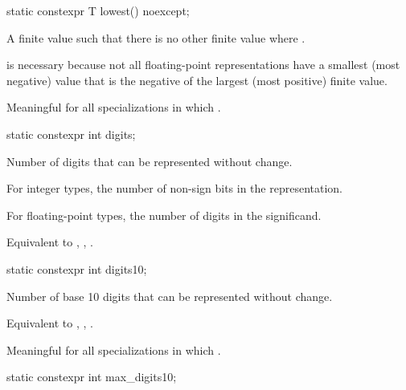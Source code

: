 %
\begin{itemdecl}
static constexpr T lowest() noexcept;
\end{itemdecl}

\begin{itemdescr}
\pnum
A finite value  such that there is no other finite
value  where .
\begin{footnote}
 is necessary because not all
floating-point representations have a smallest (most negative) value that is
the negative of the largest (most positive) finite value.
\end{footnote}

\pnum
Meaningful for all specializations in which .
\end{itemdescr}

%
\begin{itemdecl}
static constexpr int digits;
\end{itemdecl}

\begin{itemdescr}
\pnum
Number of
digits that can be represented without change.

\pnum
For integer types, the number of non-sign bits in the representation.

\pnum
For floating-point types, the number of  digits in the
significand.
\begin{footnote}
Equivalent to , ,
.
\end{footnote}
\end{itemdescr}

%
\begin{itemdecl}
static constexpr int digits10;
\end{itemdecl}

\begin{itemdescr}
\pnum
Number of base 10 digits that can be represented without
change.
\begin{footnote}
Equivalent to , ,
.
\end{footnote}

\pnum
Meaningful for all specializations in which
.
\end{itemdescr}

%
\begin{itemdecl}
static constexpr int max_digits10;
\end{itemdecl}

